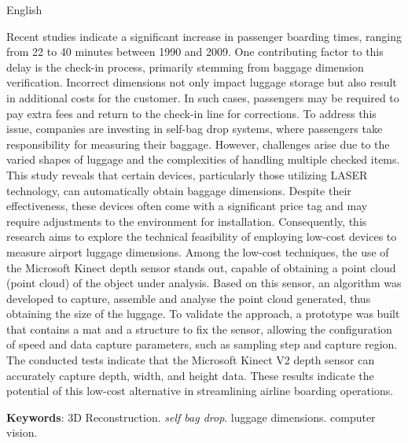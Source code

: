 \begin{resumo}
    \begin{otherlanguage*}{English}
        
        Recent studies indicate a significant increase in passenger boarding times, ranging from 22 to 40 minutes between 1990 and 2009. One contributing factor to this delay is the check-in process, primarily stemming from baggage dimension verification. Incorrect dimensions not only impact luggage storage but also result in additional costs for the customer. In such cases, passengers may be required to pay extra fees and return to the check-in line for corrections.
        To address this issue, companies are investing in self-bag drop systems, where passengers take responsibility for measuring their baggage. However, challenges arise due to the varied shapes of luggage and the complexities of handling multiple checked items. This study reveals that certain devices, particularly those utilizing LASER technology, can automatically obtain baggage dimensions. Despite their effectiveness, these devices often come with a significant price tag and may require adjustments to the environment for installation. Consequently, this research aims to explore the technical feasibility of employing low-cost devices to measure airport luggage dimensions.
        Among the low-cost techniques, the use of the Microsoft Kinect depth sensor stands out, capable of obtaining a point cloud (point cloud) of the object under analysis. Based on this sensor, an algorithm was developed to capture, assemble and analyse the point cloud generated, thus obtaining the size of the luggage.
        To validate the approach, a prototype was built that contains a mat and a structure to fix the sensor, allowing the configuration of speed and data capture parameters, such as sampling step and capture region.
        The conducted tests indicate that the Microsoft Kinect V2 depth sensor can accurately capture depth, width, and height data. These results indicate the potential of this low-cost alternative in streamlining airline boarding operations.
            
       \vspace{\onelineskip}
       \noindent
       \textbf{Keywords}: 3D Reconstruction. \textit{self bag drop}. luggage dimensions. computer vision.
    \end{otherlanguage*}
\end{resumo}


